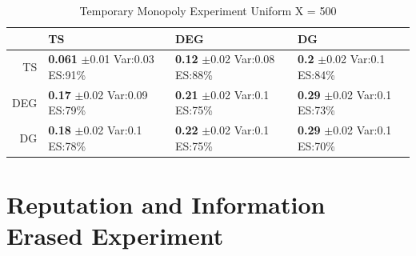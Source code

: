 \documentclass[11pt,letterpaper]{article}
\begin{document}
\begin{table}[H]
\centering
\caption{Temporary Monopoly Experiment Uniform X = 500} 
\begin{tabular}{rlll}
  \hline
 & TS & DEG &  DG \\ 
  \hline
TS & \makecell{\textbf{0.061} $\pm$0.01\\Var:0.03\\ES:91\%} & \makecell{\textbf{0.12} $\pm$0.02\\Var:0.08\\ES:88\%} & \makecell{\textbf{0.2} $\pm$0.02\\Var:0.1\\ES:84\%} \\ 
  DEG & \makecell{\textbf{0.17} $\pm$0.02\\Var:0.09\\ES:79\%} & \makecell{\textbf{0.21} $\pm$0.02\\Var:0.1\\ES:75\%} & \makecell{\textbf{0.29} $\pm$0.02\\Var:0.1\\ES:73\%} \\ 
   DG & \makecell{\textbf{0.18} $\pm$0.02\\Var:0.1\\ES:78\%} & \makecell{\textbf{0.22} $\pm$0.02\\Var:0.1\\ES:75\%} & \makecell{\textbf{0.29} $\pm$0.02\\Var:0.1\\ES:70\%} \\ 
   \hline
\end{tabular}
\end{table}

\section{Reputation and Information Erased Experiment}
\end{document}
